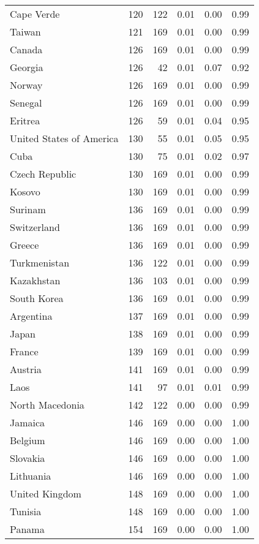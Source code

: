 \begin{longtable}[t]{lrrrrr}
Cape Verde & 120 & 122 & 0.01 & 0.00 & 0.99\\
\addlinespace
Taiwan & 121 & 169 & 0.01 & 0.00 & 0.99\\
Canada & 126 & 169 & 0.01 & 0.00 & 0.99\\
Georgia & 126 & 42 & 0.01 & 0.07 & 0.92\\
Norway & 126 & 169 & 0.01 & 0.00 & 0.99\\
Senegal & 126 & 169 & 0.01 & 0.00 & 0.99\\
\addlinespace
Eritrea & 126 & 59 & 0.01 & 0.04 & 0.95\\
United States of America & 130 & 55 & 0.01 & 0.05 & 0.95\\
Cuba & 130 & 75 & 0.01 & 0.02 & 0.97\\
Czech Republic & 130 & 169 & 0.01 & 0.00 & 0.99\\
Kosovo & 130 & 169 & 0.01 & 0.00 & 0.99\\
\addlinespace
Surinam & 136 & 169 & 0.01 & 0.00 & 0.99\\
Switzerland & 136 & 169 & 0.01 & 0.00 & 0.99\\
Greece & 136 & 169 & 0.01 & 0.00 & 0.99\\
Turkmenistan & 136 & 122 & 0.01 & 0.00 & 0.99\\
Kazakhstan & 136 & 103 & 0.01 & 0.00 & 0.99\\
\addlinespace
South Korea & 136 & 169 & 0.01 & 0.00 & 0.99\\
Argentina & 137 & 169 & 0.01 & 0.00 & 0.99\\
Japan & 138 & 169 & 0.01 & 0.00 & 0.99\\
France & 139 & 169 & 0.01 & 0.00 & 0.99\\
Austria & 141 & 169 & 0.01 & 0.00 & 0.99\\
\addlinespace
Laos & 141 & 97 & 0.01 & 0.01 & 0.99\\
North Macedonia & 142 & 122 & 0.00 & 0.00 & 0.99\\
Jamaica & 146 & 169 & 0.00 & 0.00 & 1.00\\
Belgium & 146 & 169 & 0.00 & 0.00 & 1.00\\
Slovakia & 146 & 169 & 0.00 & 0.00 & 1.00\\
\addlinespace
Lithuania & 146 & 169 & 0.00 & 0.00 & 1.00\\
United Kingdom & 148 & 169 & 0.00 & 0.00 & 1.00\\
Tunisia & 148 & 169 & 0.00 & 0.00 & 1.00\\
Panama & 154 & 169 & 0.00 & 0.00 & 1.00\\

\end{longtable}
